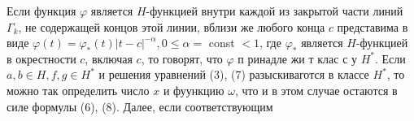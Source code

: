 \documentclass[10pt]{article}
\begin{document}
Если функция $\varphi$ является $H$-функцией внутри каждой из закрытой части линий $\Gamma_{k}$, не содержащей концов этой линии, вблизи же любого конца $c$ представима в виде $\varphi(t)=\varphi_{*}(t)|t-c|^{-\alpha}, 0 \leqslant \alpha=$ const $<1$, где $\varphi_{*}$ является $H$-функцией в окрестности $c$, включая $c$, то говорят, что $\varphi$ п ринадле жи т клас с у $H^{*}$. Если $a, b \in H, f, g \in H^{*}$ и решения уравнений (3), (7) разыскиваготся в классе $H^{*}$, то можно так определить число $x$ и фуункцию $\omega$, что и в этом случае остаются в силе формулы (6), (8). Далее, если соответствующим
\end{document}
